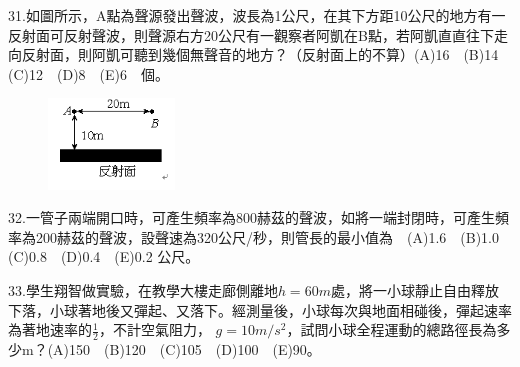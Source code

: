 \documentclass[cn,10pt,math=newtx]{elegantbook}
\begin{document}
\newpage


\begin{example}
   31.如圖所示，A點為聲源發出聲波，波長為1公尺，在其下方距10公尺的地方有一反射面可反射聲波，則聲源右方20公尺有一觀察者阿凱在B點，若阿凱直直往下走向反射面，則阿凱可聽到幾個無聲音的地方？（反射面上的不算）(A)16　(B)14　(C)12　(D)8　(E)6　個。\\
    \rightline{[成德高中教甄109]}
\end{example}
\begin{solution}
    
\end{solution}
\begin{figure}[htbp]
    \flushright
    \includegraphics[width=0.3\textwidth]{image/109成德31.png}
  \end{figure}
\newpage



\begin{example}
   32.一管子兩端開口時，可產生頻率為800赫茲的聲波，如將一端封閉時，可產生頻率為200赫茲的聲波，設聲速為320公尺/秒，則管長的最小值為　(A)1.6　(B)1.0　(C)0.8　(D)0.4　(E)0.2  公尺。\\
    \rightline{[成德高中教甄109]}
\end{example}
\begin{solution}
    
\end{solution}

\newpage


\begin{example}
   33.學生翔智做實驗，在教學大樓走廊側離地$h=60m$處，將一小球靜止自由釋放下落，小球著地後又彈起、又落下。經測量後，小球每次與地面相碰後，彈起速率為著地速率的$\frac{1}{2}$，不計空氣阻力， $g=10 m/s^2$，試問小球全程運動的總路徑長為多少m？(A)150　(B)120　(C)105　(D)100　(E)90。\\
    \rightline{[成德高中教甄109]}
\end{example}
\begin{solution}
    
\end{solution}

\newpage
\end{document}
